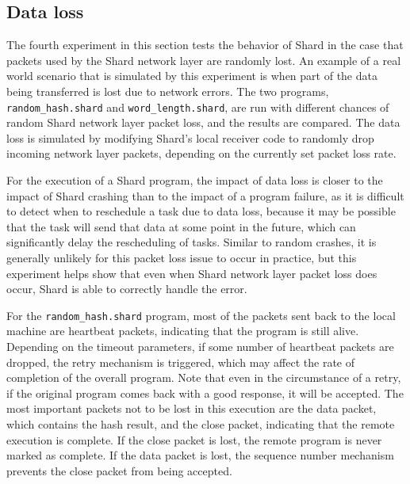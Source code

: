 \documentclass[twoside]{report}
\begin{document}
\subsection{Data loss}
The fourth experiment in this section tests the behavior of Shard in the case that packets used by the Shard network layer are randomly lost.
An example of a real world scenario that is simulated by this experiment is when part of the data being transferred is lost due to network errors.
The two programs, \texttt{random\_hash.shard} and \texttt{word\_length.shard}, are run with different chances of random Shard network layer packet loss, and the results are compared.
The data loss is simulated by modifying Shard's local receiver code to randomly drop incoming network layer packets, depending on the currently set packet loss rate.

For the execution of a Shard program, the impact of data loss is closer to the impact of Shard crashing than to the impact of a program failure, as it is difficult to detect when to reschedule a task due to data loss, because it may be possible that the task will send that data at some point in the future, which can significantly delay the rescheduling of tasks.
Similar to random crashes, it is generally unlikely for this packet loss issue to occur in practice, but this experiment helps show that even when Shard network layer packet loss does occur, Shard is able to correctly handle the error.

For the \texttt{random\_hash.shard} program, most of the packets sent back to the local machine are heartbeat packets, indicating that the program is still alive.
Depending on the timeout parameters, if some number of heartbeat packets are dropped, the retry mechanism is triggered, which may affect the rate of completion of the overall program.
Note that even in the circumstance of a retry, if the original program comes back with a good response, it will be accepted.
The most important packets not to be lost in this execution are the data packet, which contains the hash result, and the close packet, indicating that the remote execution is complete.
If the close packet is lost, the remote program is never marked as complete.
If the data packet is lost, the sequence number mechanism prevents the close packet from being accepted.
\end{document}
